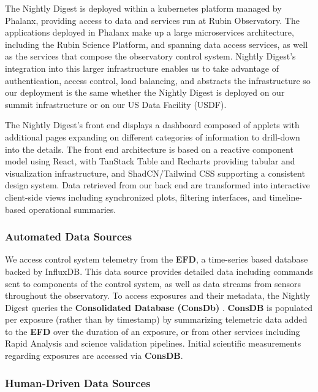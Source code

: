 The Nightly Digest is deployed within a kubernetes platform managed by Phalanx, providing
access to data and services run at Rubin Observatory\cite{Phalanx-SPIE24, Phalanx-Docs}. The applications
deployed in Phalanx make up a large microservices architecture, including the Rubin
Science Platform, and spanning data access services, as well as the services that compose
the observatory control system. Nightly Digest’s integration into this larger
infrastructure enables us to take advantage of authentication, access control, load
balancing, and abstracts the infrastructure so our deployment is the same whether the Nightly
Digest is deployed on our summit infrastructure or on our US Data Facility (USDF).


The Nightly Digest’s front end displays a dashboard composed of applets with additional
pages expanding on different categories of information to drill-down into the details. The
front end architecture is based on a reactive component model using React, with TanStack
Table\cite{tanstack-table} and Recharts\cite{recharts} providing tabular and visualization infrastructure, and ShadCN/Tailwind
CSS\cite{shadcn-ui} supporting a consistent design system. Data retrieved from our back end are
transformed into interactive client-side views including synchronized plots, filtering
interfaces, and timeline-based operational summaries.

\subsubsection{Automated Data Sources}

We access control system telemetry from the \textbf{EFD}, a time-series based database backed by
InfluxDB\cite{SQR-068}. This data source provides detailed data including commands sent to components of the control
system, as well as data streams from sensors throughout the observatory. To access
exposures and their metadata, the Nightly Digest queries the \textbf{Consolidated Database (ConsDb)} \cite{DMTN-227}.
\textbf{ConsDB} is populated per exposure (rather than by timestamp) by summarizing telemetric data added to the \textbf{EFD} over the duration of an
exposure, or from other services including Rapid Analysis and science validation
pipelines. Initial scientific measurements regarding exposures are accessed via \textbf{ConsDB}.

\subsubsection{Human-Driven Data Sources}

